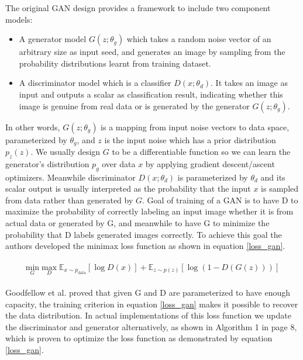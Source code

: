 \documentclass[10pt,twocolumn,letterpaper]{article}
\begin{document}
The original GAN design provides a framework to include two component models:
\begin{itemize}
    \item A generator model $G(z; \theta_g)$ which takes a random noise vector of an arbitrary size as input seed, and generates an image by sampling from the probability distributions learnt from training dataset. 
    \item A discriminator model which is a classifier $D(x;\theta_d)$. It takes an image as input and outputs a scalar as classification result, indicating whether this image is genuine from real data or is generated by the generator $G(z; \theta_g)$.
\end{itemize}

In other words, $G(z; \theta_g)$ is a mapping from input noise vectors to data space, parameterized by $\theta_g$, and $z$ is the input noise which has a prior distribution $p_z(z)$. We usually design $G$ to be a differentiable function so we can learn the generator's distribution $p_g$ over data $x$ by applying gradient descent/ascent optimizers. Meanwhile discriminator $D(x;\theta_d)$ is parameterized by $\theta_d$ and its scalar output is usually interpreted as the probability that the input $x$ is sampled from data rather than generated by $G$. Goal of training of a GAN is to have D to maximize the probability of correctly labeling an input image whether it is from actual data or generated by G, and meanwhile to have G to minimize the probability that D labels generated images correctly. To achieve this goal the authors developed the minimax loss function as shown in equation \ref{loss_gan}.

\begin{equation} 
\begin{split}
\begin{aligned}
\underset{G}{\text{min}}\; \underset{D}{\text{max}}\; \mathbb{E}_{x \sim p_\text{data}}\left[\log D(x)\right] + \mathbb{E}_{z \sim p(z)}\left[\log \left(1-D(G(z))\right)\right]
\end{aligned}
\end{split}
\label{loss_gan}
\end{equation}

Goodfellow et al. \cite{goodfellow2014generative} proved that given G and D are parameterized to have enough capacity, the training criterion in equation \ref{loss_gan} makes it possible to recover the data distribution. In actual implementations of this loss function we update the discriminator and generator alternatively, as shown in Algorithm 1 in page 8, which is proven to optimize the loss function as demonstrated by equation \ref{loss_gan}.
\end{document}

